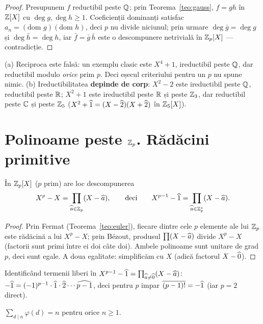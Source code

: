 \begin{proof}
Presupunem $f$ reductibil peste $\mathbb{Q}$; prin Teorema~\ref{teo:gauss}, $f=gh$ în $\mathbb{Z}[X]$ cu $\deg g,\deg h\ge1$. Coeficienții dominanți satisfac $a_n=(\text{dom }g)(\text{dom }h)$, deci $p$ nu divide niciunul; prin urmare $\deg\bar g=\deg g$ și $\deg\bar h=\deg h$, iar $\bar f=\bar g\,\bar h$ este o descompunere netrivială în $\mathbb{Z}_p[X]$ --- contradicție.
\end{proof}

\begin{observatie}
(a) Reciproca este falsă: un exemplu clasic este $X^4+1$, ireductibil peste $\mathbb{Q}$, dar reductibil modulo \emph{orice} prim $p$. Deci eșecul criteriului pentru un $p$ nu spune nimic. (b) Ireductibilitatea \textbf{depinde de corp}: $X^2-2$ este ireductibil peste $\mathbb{Q}$, reductibil peste $\mathbb{R}$; $X^2+1$ este ireductibil peste $\mathbb{R}$ și peste $\mathbb{Z}_3$, dar reductibil peste $\mathbb{C}$ și peste $\mathbb{Z}_5$ ($X^2+\widehat{1}=(X-\widehat{2})(X+\widehat{2})$ în $\mathbb{Z}_5[X]$).
\end{observatie}

\section{Polinoame peste $\mathbb{Z}_p$. Rădăcini primitive}

\begin{teorema}\label{teo:XpX}
În $\mathbb{Z}_p[X]$ ($p$ prim) are loc descompunerea
\[
X^p-X=\prod_{\widehat{a}\in\mathbb{Z}_p}(X-\widehat{a}),\qquad\text{deci}\qquad X^{p-1}-\widehat{1}=\prod_{\widehat{a}\in\mathbb{Z}_p^*}(X-\widehat{a}).
\]
\end{teorema}

\begin{proof}
Prin Fermat (Teorema~\ref{teo:euler}), fiecare dintre cele $p$ elemente ale lui $\mathbb{Z}_p$ este rădăcină a lui $X^p-X$; prin Bézout, produsul $\prod(X-\widehat{a})$ divide $X^p-X$ (factorii sunt primi între ei doi câte doi). Ambele polinoame sunt unitare de grad $p$, deci sunt egale. A doua egalitate: simplificăm cu $X$ (adică factorul $X-\widehat{0}$).
\end{proof}

\begin{corolar}
Identificând termenii liberi în $X^{p-1}-\widehat{1}=\prod_{\widehat{a}\neq\widehat{0}}(X-\widehat{a})$:
$-\widehat{1}=(-1)^{p-1}\cdot\widehat{1}\cdot\widehat{2}\cdots\widehat{p-1}$, deci pentru $p$ impar $\overline{(p-1)!}=-\widehat{1}$ (iar $p=2$ direct).
\end{corolar}

\begin{lema}\label{lema:sumaphi}
$\displaystyle\sum_{d\mid n}\varphi(d)=n$ pentru orice $n\ge1$.
\end{lema}

